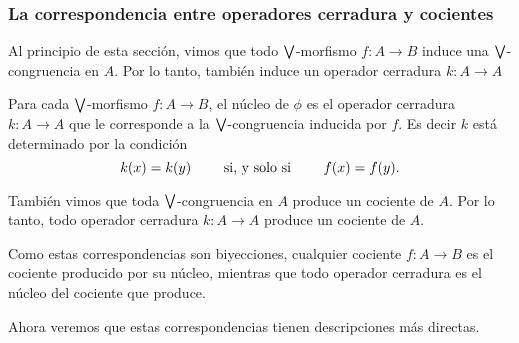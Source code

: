 \subsubsection{La correspondencia entre operadores cerradura y cocientes}

Al principio de esta sección,
vimos que todo $\bigvee$-morfismo $f:A\to B$ induce una
$\bigvee$-congruencia en $A$. Por lo tanto, también induce un
operador cerradura $k:A\to A$

\begin{definition}
    Para cada $\bigvee$-morfismo $f:A\to B$, el núcleo de $\phi$
    es el operador cerradura $k:A\to A$ que le corresponde a
    la $\bigvee$-congruencia inducida por $f$.
    Es decir $k$ está determinado por la condición
    \[
        k(x) = k(y) \qquad\text{ si, y solo si }\qquad f(x) = f(y)
    .\]
\end{definition}

También vimos que toda $\bigvee$-congruencia en $A$ produce un
cociente de $A$. Por lo tanto, todo operador cerradura $k:A\to A$
produce un cociente de $A$.

Como estas correspondencias son biyecciones,
cualquier cociente $f:A\to B$ es el cociente producido por
su núcleo, mientras que todo operador cerradura es el
núcleo del cociente que produce.

Ahora veremos que estas correspondencias tienen descripciones más
directas.


